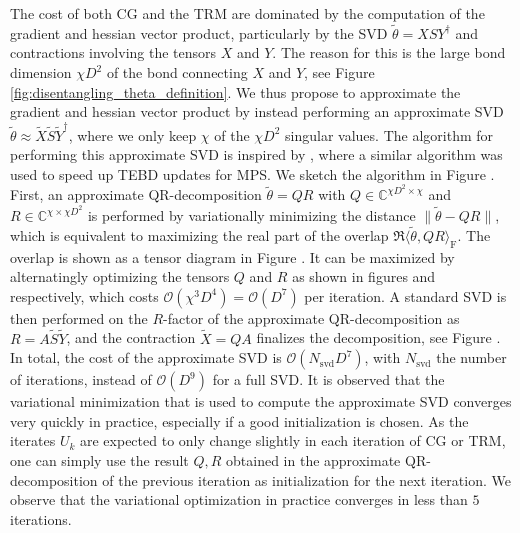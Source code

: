 The cost of both CG and the TRM are dominated by the computation of the gradient and hessian vector product, particularly by the SVD $\tilde{\theta} = XSY^\dagger$ and contractions involving the tensors $X$ and $Y$. The reason for this is the large bond dimension $\chi D^2$ of the bond connecting $X$ and $Y$, see Figure \ref{fig:disentangling_theta_definition}. We thus propose to approximate the gradient and hessian vector product by instead performing an approximate SVD $\tilde{\theta} \approx \tilde{X}\tilde{S}\tilde{Y}^\dagger$, where we only keep $\chi$ of the $\chi D^2$ singular values. The algorithm for performing this approximate SVD is inspired by \cite{cite:fast_time_evolution_of_mps_using_qr}, where a similar algorithm was used to speed up TEBD updates for MPS. We sketch the algorithm in Figure . First, an approximate QR-decomposition $\tilde{\theta} = QR$ with $Q\in\mathbb{C}^{\chi D^2\times\chi}$ and $R\in\mathbb{C}^{\chi\times\chi D^2}$ is performed by variationally minimizing the distance $\lVert \tilde{\theta} - QR \rVert$, which is equivalent to maximizing the real part of the overlap $\Re\langle\tilde{\theta},QR\rangle_\text{F}$. The overlap is shown as a tensor diagram in Figure . It can be maximized by alternatingly optimizing the tensors $Q$ and $R$ as shown in figures  and  respectively, which costs $\mathcal{O}(\chi^3D^4) = \mathcal{O}(D^7)$ per iteration. A standard SVD is then performed on the $R$-factor of the approximate QR-decomposition as $R = A\tilde{S}\tilde{Y}$, and the contraction $\tilde{X} = QA$ finalizes the decomposition, see Figure . In total, the cost of the approximate SVD is $\mathcal{O}(N_\text{svd}D^7)$, with $N_\text{svd}$ the number of iterations, instead of $\mathcal{O}(D^9)$ for a full SVD. It is observed that the variational minimization that is used to compute the approximate SVD converges very quickly in practice, especially if a good initialization is chosen. As the iterates $U_k$ are expected to only change slightly in each iteration of CG or TRM, one can simply use the result $Q, R$ obtained in the approximate QR-decomposition of the previous iteration as initialization for the next iteration. We observe that the variational optimization in practice converges in less than $5$ iterations. \par
